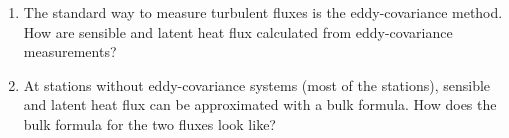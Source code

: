 \documentclass{article}
\begin{document}
\begin{enumerate}[label=(\alph*)]
    \item The standard way to measure turbulent fluxes is the eddy-covariance method. How are sensible and latent heat flux calculated from eddy-covariance measurements? %
    \item At stations without eddy-covariance systems (most of the stations), sensible and latent heat flux can be approximated with a bulk formula. How does the bulk formula for the two fluxes look like? %
\end{enumerate}
\end{document}
